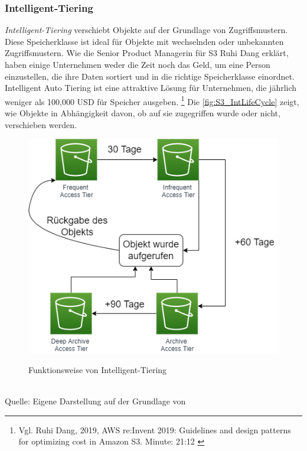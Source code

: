 \subsubsection{Intelligent-Tiering}
\textit{Intelligent-Tiering} verschiebt Objekte auf der Grundlage von Zugriffsmustern. Diese Speicherklasse ist ideal für Objekte mit wechselnden oder unbekannten Zugriffsmustern. Wie die Senior Product Managerin für S3 Ruhi Dang erklärt, haben einige Unternehmen weder die Zeit noch das Geld, um eine Person einzustellen, die ihre Daten sortiert und in die richtige Speicherklasse einordnet. Intelligent Auto Tiering ist eine attraktive Lösung für Unternehmen, die jährlich weniger als 100,000 USD für Speicher ausgeben. \footnote{Vgl. Ruhi Dang, 2019, AWS re:Invent 2019: Guidelines and design patterns for optimizing cost in Amazon S3. Minute: 21:12 \cite{AMZ16}}
Die \autoref{fig:S3_IntLifeCycle} zeigt, wie Objekte in Abhängigkeit davon, ob auf sie zugegriffen wurde oder nicht, verschieben werden. 
\begin{figure}[h!]
  \centering
  \includegraphics[scale=0.7]{sources/S3_IntLifeCycle}
  \caption[Funktionsweise von Intelligent-Tiering]{}\label{fig:S3_IntLifeCycle} Funktionsweise von Intelligent-Tiering
\end{figure}\\
Quelle: Eigene Darstellung auf der Grundlage von \\
